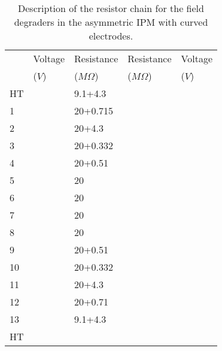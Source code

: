 \begin{table}[ht]
	\centering
	\caption[Description of the resistor chain for the field degraders in the asymmetric IPM]
	{Description of the resistor chain for the field degraders in the asymmetric IPM with curved electrodes.}
	\label{}
	\begin{tabular}{lllll}
		\toprule
		   & Voltage & Resistance  & Resistance  & Voltage \\
		   & ($V$)   & ($M\Omega$) & ($M\Omega$) & ($V$)   \\
		\midrule
		HT &         & 9.1+4.3     &             &         \\
		1  &         & 20+0.715    &             &         \\
		2  &         & 20+4.3      &             &         \\
		3  &         & 20+0.332    &             &         \\
		4  &         & 20+0.51     &             &         \\
		5  &         & 20          &             &         \\
		6  &         & 20          &             &         \\
		7  &         & 20          &             &         \\
		8  &         & 20          &             &         \\
		9  &         & 20+0.51     &             &         \\
		10 &         & 20+0.332    &             &         \\
		11 &         & 20+4.3      &             &         \\
		12 &         & 20+0.71     &             &         \\
		13 &         & 9.1+4.3     &             &         \\
		HT &         &             &             &         \\
		\bottomrule
	\end{tabular}
\end{table}